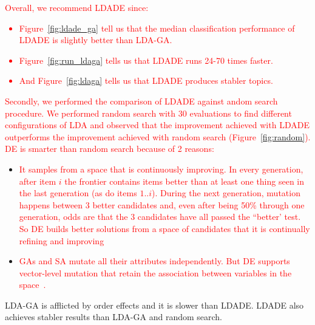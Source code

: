 \documentclass[twocolumn,5p,sort&compress]{elsarticle}
\newcommand{\bi}{\begin{itemize}}
\newcommand{\ei}{\end{itemize}}
\theoremstyle{break}
\begin{document}
\textcolor{red}{Overall, we recommend LDADE since:
\bi
\item Figure~\ref{fig:ldade_ga}
tell us that the
median classification performance of
  LDADE is slightly better than LDA-GA.
\item  Figure~\ref{fig:run_ldaga} tells us that
LDADE runs  24-70 times faster.
\item  
And Figure~\ref{fig:ldaga} tells us
that LDADE produces stabler
topics.
\ei}
 
\textcolor{red}{Secondly, we performed the comparison of LDADE against  andom search procedure.
We performed random search with 30 evaluations to find different configurations of LDA and observed that the improvement achieved with LDADE outperforms the improvement achieved with random search (Figure~\ref{fig:random}). DE is smarter than random search because of 2 reasons:} 
\bi
\item \textcolor{red}{It samples from a space that is continuously improving. In every generation, after item $i$ the frontier contains   items
  better than at least one thing
seen in the last generation (as do  items $1..i$).   During the next generation, mutation happens between 3 better candidates
and, even after being 50\% through one generation,
odds are that the 3 candidates have all passed the ``better'
test. So DE builds better solutions
from a space of candidates that it is continually
refining and improving}
\item \textcolor{red}{GAs and SA mutate all their
attributes independently. But DE  supports vector-level mutation that retain the association between variables in the space~\cite{das2011differential}.}
\ei




  

  


  \begin{lesson}
    LDA-GA is afflicted  by order effects and it is slower than LDADE.  LDADE also achieves stabler results than LDA-GA and random search. 
  \end{lesson}
\end{document}
